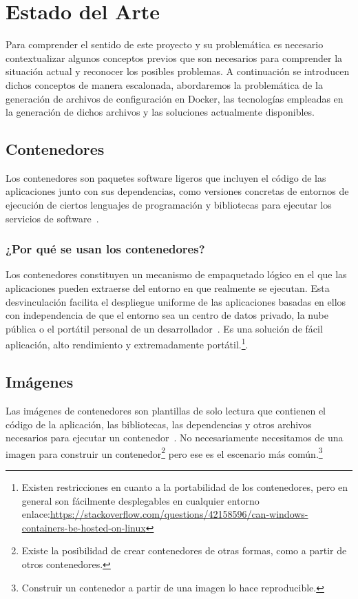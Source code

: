 \documentclass[12pt, a4paper, twoside]{article}
\begin{document}
\section{Estado del Arte}
\label{sec:Estado del Arte}
Para comprender el sentido de este proyecto y su problemática es necesario contextualizar algunos conceptos previos que son necesarios para comprender la situación actual y reconocer los posibles problemas.
A continuación se introducen dichos conceptos de manera escalonada, abordaremos la problemática de la generación de archivos de configuración en Docker, las tecnologías empleadas en la generación de dichos archivos y las soluciones actualmente disponibles.

\subsection{Contenedores}
Los contenedores son paquetes software ligeros que incluyen el código de las aplicaciones junto con sus dependencias, como versiones concretas de entornos de ejecución de ciertos lenguajes de programación y bibliotecas para ejecutar los servicios de software~\cite{googlecontainers}.
\subsubsection{¿Por qué se usan los contenedores?}
Los contenedores constituyen un mecanismo de empaquetado lógico en el que las aplicaciones pueden extraerse del entorno en que realmente se ejecutan. 
Esta desvinculación facilita el despliegue uniforme de las aplicaciones basadas en ellos con independencia de que el entorno sea un centro de datos privado, la nube pública o el portátil personal de un desarrollador~\cite{googlecontainers}.
Es una solución de fácil aplicación, alto rendimiento y extremadamente portátil.\footnote{Existen restricciones en cuanto a la portabilidad de los contenedores, pero en general son fácilmente desplegables en cualquier entorno enlace:\href{https://stackoverflow.com/questions/42158596/can-windows-containers-be-hosted-on-linux}{https://stackoverflow.com/questions/42158596/can-windows-containers-be-hosted-on-linux}}.
\newpage

\subsection{Imágenes}
Las imágenes de contenedores son plantillas de solo lectura que contienen el código de la aplicación, las bibliotecas, las dependencias y otros archivos necesarios para ejecutar un contenedor~\cite{awsdocker}. 
No necesariamente necesitamos de una imagen para construir un contenedor\footnote{Existe la posibilidad de crear contenedores de otras formas, como a partir de otros contenedores.} pero ese es el escenario más común.\footnote{Construir un contenedor a partir de una imagen lo hace reproducible.}
\end{document}
